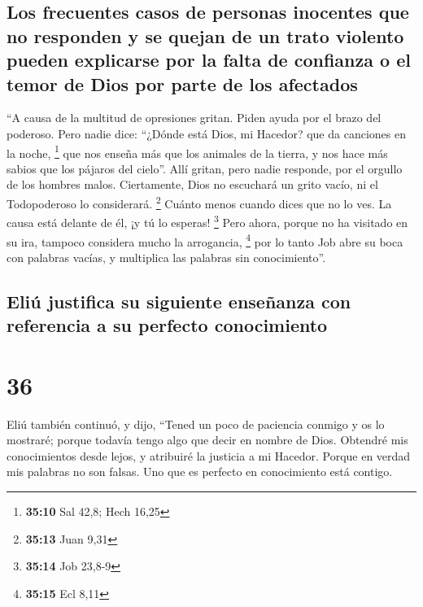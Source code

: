 \hypertarget{los-frecuentes-casos-de-personas-inocentes-que-no-responden-y-se-quejan-de-un-trato-violento-pueden-explicarse-por-la-falta-de-confianza-o-el-temor-de-dios-por-parte-de-los-afectados}{%
\subsection{Los frecuentes casos de personas inocentes que no responden
y se quejan de un trato violento pueden explicarse por la falta de
confianza o el temor de Dios por parte de los
afectados}\label{los-frecuentes-casos-de-personas-inocentes-que-no-responden-y-se-quejan-de-un-trato-violento-pueden-explicarse-por-la-falta-de-confianza-o-el-temor-de-dios-por-parte-de-los-afectados}}

 ``A causa de la multitud de opresiones gritan. Piden
ayuda por el brazo del poderoso.  Pero nadie dice:
``¿Dónde está Dios, mi Hacedor? que da canciones en la noche,
\footnote{\textbf{35:10} Sal 42,8; Hech 16,25}  que nos
enseña más que los animales de la tierra, y nos hace más sabios que los
pájaros del cielo''.  Allí gritan, pero nadie responde,
por el orgullo de los hombres malos.  Ciertamente, Dios
no escuchará un grito vacío, ni el Todopoderoso lo considerará.
\footnote{\textbf{35:13} Juan 9,31}  Cuánto menos cuando
dices que no lo ves. La causa está delante de él, ¡y tú lo esperas!
\footnote{\textbf{35:14} Job 23,8-9}  Pero ahora, porque
no ha visitado en su ira, tampoco considera mucho la arrogancia,
\footnote{\textbf{35:15} Ecl 8,11}  por lo tanto Job abre
su boca con palabras vacías, y multiplica las palabras sin
conocimiento''.

\hypertarget{eliuxfa-justifica-su-siguiente-enseuxf1anza-con-referencia-a-su-perfecto-conocimiento}{%
\subsection{Eliú justifica su siguiente enseñanza con referencia a su
perfecto
conocimiento}\label{eliuxfa-justifica-su-siguiente-enseuxf1anza-con-referencia-a-su-perfecto-conocimiento}}

\hypertarget{section-35}{%
\section{36}\label{section-35}}

 Eliú también continuó, y dijo,  ``Tened un
poco de paciencia conmigo y os lo mostraré; porque todavía tengo algo
que decir en nombre de Dios.  Obtendré mis conocimientos
desde lejos, y atribuiré la justicia a mi Hacedor.  Porque
en verdad mis palabras no son falsas. Uno que es perfecto en
conocimiento está contigo.

